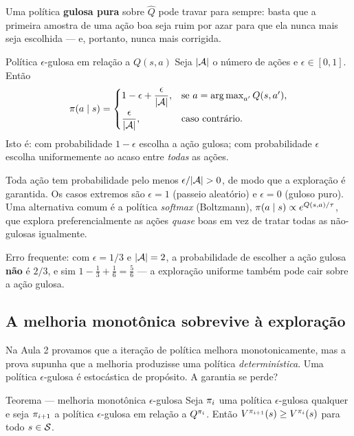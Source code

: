 \documentclass[11pt]{article}
\newcommand{\Qhat}{\widehat{Q}}
\begin{document}
\begin{alertabox}
  Uma política \textbf{gulosa pura} sobre $\Qhat$ pode travar para sempre: basta
  que a primeira amostra de uma ação boa seja ruim por azar para que ela nunca
  mais seja escolhida --- e, portanto, nunca mais corrigida.
\end{alertabox}

\begin{defbox}{Política $\epsilon$-gulosa em relação a $Q(s,a)$}
  Seja $\lvert\mathcal{A}\rvert$ o número de ações e $\epsilon \in [0,1]$. Então
  \[
    \pi(a \mid s) =
    \begin{cases}
      1 - \epsilon + \dfrac{\epsilon}{\lvert\mathcal{A}\rvert}, & \text{se } a = \operatorname*{arg\,max}_{a'} Q(s,a'),\\[2ex]
      \dfrac{\epsilon}{\lvert\mathcal{A}\rvert}, & \text{caso contrário.}
    \end{cases}
  \]
  Isto é: com probabilidade $1-\epsilon$ escolha a ação gulosa; com
  probabilidade $\epsilon$ escolha uniformemente ao acaso entre \emph{todas} as
  ações.
\end{defbox}

Toda ação tem probabilidade pelo menos $\epsilon/\lvert\mathcal{A}\rvert > 0$, de modo que a
exploração é garantida. Os casos extremos são $\epsilon = 1$ (passeio
aleatório) e $\epsilon = 0$ (guloso puro). Uma alternativa comum é a política
\emph{softmax} (Boltzmann), $\pi(a \mid s) \propto e^{Q(s,a)/\tau}$, que
explora preferencialmente as ações \emph{quase} boas em vez de tratar todas as
não-gulosas igualmente.

\begin{alertabox}
  Erro frequente: com $\epsilon = 1/3$ e $\lvert\mathcal{A}\rvert = 2$, a probabilidade de
  escolher a ação gulosa \textbf{não} é $2/3$, e sim
  $1 - \tfrac{1}{3} + \tfrac{1}{6} = \tfrac{5}{6}$ --- a exploração uniforme
  também pode cair sobre a ação gulosa.
\end{alertabox}

\subsection{A melhoria monotônica sobrevive à exploração}

Na Aula 2 provamos que a iteração de política melhora monotonicamente, mas a
prova supunha que a melhoria produzisse uma política \emph{determinística}. Uma
política $\epsilon$-gulosa é estocástica de propósito. A garantia se perde?

\begin{teobox}{Teorema — melhoria monotônica $\epsilon$-gulosa}
  Seja $\pi_i$ uma política $\epsilon$-gulosa qualquer e seja $\pi_{i+1}$ a
  política $\epsilon$-gulosa em relação a $Q^{\pi_i}$. Então
  $V^{\pi_{i+1}}(s) \ge V^{\pi_i}(s)$ para todo $s \in \mathcal{S}$.
\end{teobox}
\end{document}
